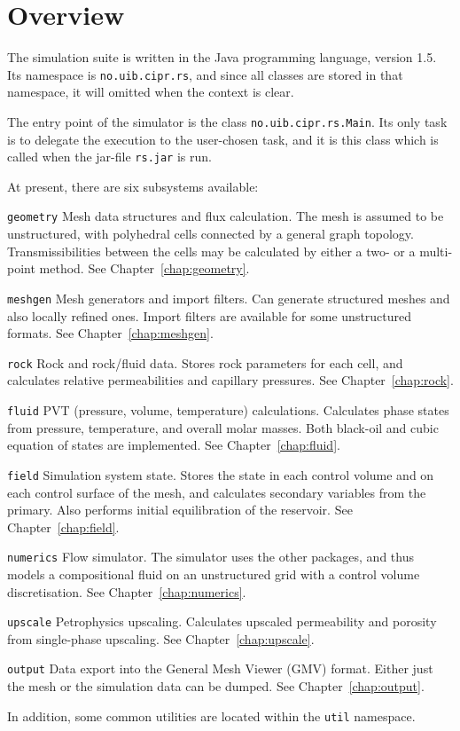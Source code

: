 \chapter{Overview}

\minitoc

The simulation suite is written in the Java programming language,
version 1.5. Its namespace is \texttt{no.uib.cipr.rs}, and since all
classes are stored in that namespace, it will omitted when the context
is clear.

The entry point of the simulator is the class
\texttt{no.uib.cipr.rs.Main}. Its only task is to delegate the
execution to the user-chosen task, and it is this class which is
called when the jar-file \texttt{rs.jar} is run.



At present, there are six subsystems available:
\begin{list}{}{}
\item[\texttt{geometry}] Mesh data structures and flux calculation. The mesh is
  assumed to be unstructured, with polyhedral cells connected by a
  general graph topology. Transmissibilities between the cells may be
  calculated by either a two- or a multi-point method. See
  Chapter~\ref{chap:geometry}.
\item[\texttt{meshgen}] Mesh generators and import filters. Can generate
  structured meshes and also locally refined ones. Import filters are
  available for some unstructured formats. See
  Chapter~\ref{chap:meshgen}.
\item[\texttt{rock}] Rock and rock/fluid data. Stores rock parameters for each
  cell, and calculates relative permeabilities and capillary
  pressures. See Chapter~\ref{chap:rock}.
\item[\texttt{fluid}] PVT (pressure, volume, temperature) calculations.
  Calculates phase states from pressure, temperature, and overall
  molar masses. Both black-oil and cubic equation of states are
  implemented. See Chapter~\ref{chap:fluid}.
\item[\texttt{field}] Simulation system state. Stores the state in each control
  volume and on each control surface of the mesh, and calculates
  secondary variables from the primary. Also performs initial
  equilibration of the reservoir. See Chapter~\ref{chap:field}.
\item[\texttt{numerics}] Flow simulator. The simulator uses the other packages,
  and thus models a compositional fluid on an unstructured grid with a
  control volume discretisation. See Chapter~\ref{chap:numerics}.
\item[\texttt{upscale}] Petrophysics upscaling. Calculates upscaled
  permeability and porosity from single-phase upscaling. See
  Chapter~\ref{chap:upscale}.
\item[\texttt{output}] Data export into the General Mesh Viewer (GMV) format.
  Either just the mesh or the simulation data can be dumped. See
  Chapter~\ref{chap:output}.
\end{list}
In addition, some common utilities are located within the
\texttt{util} namespace.

